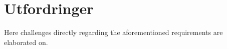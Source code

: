 \chapter{Utfordringer}
\setlength{\parindent}{2ex}
Here challenges directly regarding the aforementioned requirements are elaborated on.\par

